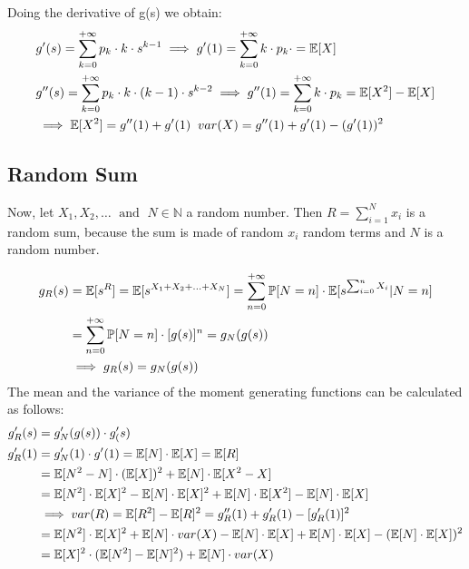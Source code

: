 Doing the derivative of g(s) we obtain:
\begin{equation}
   $$
  \begin{split}
    & g'(s) = \sum\limits_{k=0}^{+\infty} p_k \cdot k \cdot s^{k-1}
    \implies g'(1) = \sum\limits_{k=0}^{+\infty} k \cdot p_k \cdot = \exp[X] \\
    & g''(s) = \sum\limits_{k=0}^{+\infty} p_k \cdot k \cdot (k-1) \cdot s^{k-2}
    \implies g''(1) = \sum\limits_{k=0}^{+\infty} k \cdot p_k = \exp[X^2]-\exp[X] \\
    &\implies \exp[X^2] = g''(1)+g'(1) \; \; var(X) = g''(1)+g'(1)-(g'(1))^2
  \end{split}
  $$
\end{equation}

\subsection{Random Sum}
Now, let $X_1, X_2, \dotsc \; \text{ and }\; N \in \mathbb{N}$ a random number. Then $R=\sum\limits_{i=1}^{N}x_i$
is a random sum, because the sum is made of random $x_i$ random terms and $N$ is a random number.

\begin{equation}$$
  \begin{split}
    g_R(s)&=\exp[s^R]=\exp[s^{X_1+X_2+\dotsc+X_N}]=\sum\limits_{n=0}^{+\infty} \prob[N=n]\cdot \exp[s^{\sum_{i=0}^{n}X_i}|N=n]\\
    &=\sum\limits_{n=0}^{+\infty} \prob[N=n]\cdot [g(s)]^n=g_N(g(s))
    \\ & \implies g_R(s) = g_N(g(s))
  \end{split}$$
\end{equation}
The mean and the variance of the moment generating functions can be calculated as follows:
\begin{equation}
$$
\begin{split}
  g'_R(s) &= g'_N(g(s)) \cdot g'_(s) \\
  g'_R(1) &= g_N'(1)\cdot g'(1) = \exp[N]\cdot \exp[X]=\exp[R]\\
  &=\exp[N^2-N]\cdot (\exp[X])^2 + \exp[N]\cdot \exp[X^2-X] \\
  &=\exp[N^2]\cdot \exp[X]^2 - \exp[N] \cdot \exp[X]^2 +\exp[N]\cdot \exp[X^2] - \exp[N]\cdot \exp[X]\\
  & \implies var(R) = \exp[R^2]-\exp[R]^2 = g''_R(1)+g'_R(1)-[g'_R(1)]^2\\
  &=\exp[N^2] \cdot \exp[X]^2 + \exp[N] \cdot var(X) - \exp[N]\cdot \exp[X] + \exp[N] \cdot \exp[X] - (\exp[N] \cdot \exp[X])^2 \\
  &= \exp[X]^2 \cdot (\exp[N^2]-\exp[N]^2) + \exp[N] \cdot var(X)
\end{split}
$$
\end{equation}

